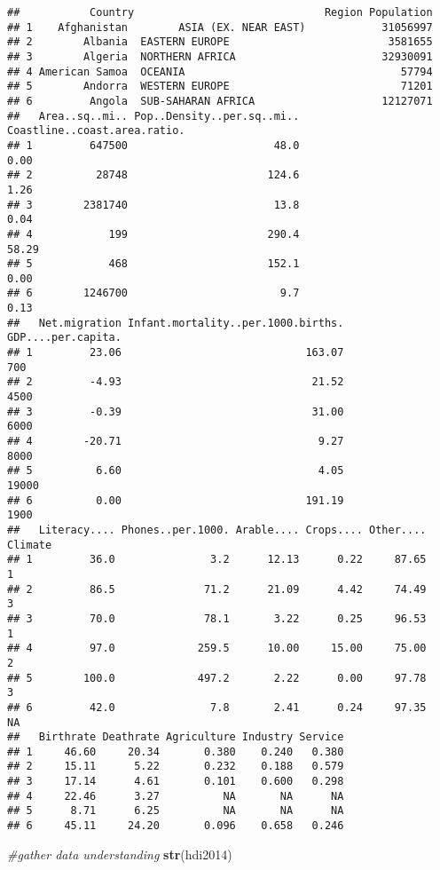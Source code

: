 \documentclass[]{article}
\newenvironment{Shaded}{\begin{snugshade}}{\end{snugshade}}
\newcommand{\CommentTok}[1]{\textcolor[rgb]{0.56,0.35,0.01}{\textit{#1}}}
\newcommand{\KeywordTok}[1]{\textcolor[rgb]{0.13,0.29,0.53}{\textbf{#1}}}
\newcommand{\NormalTok}[1]{#1}
\begin{document}
\begin{verbatim}
##           Country                              Region Population
## 1    Afghanistan        ASIA (EX. NEAR EAST)            31056997
## 2        Albania  EASTERN EUROPE                         3581655
## 3        Algeria  NORTHERN AFRICA                       32930091
## 4 American Samoa  OCEANIA                                  57794
## 5        Andorra  WESTERN EUROPE                           71201
## 6         Angola  SUB-SAHARAN AFRICA                    12127071
##   Area..sq..mi.. Pop..Density..per.sq..mi.. Coastline..coast.area.ratio.
## 1         647500                       48.0                         0.00
## 2          28748                      124.6                         1.26
## 3        2381740                       13.8                         0.04
## 4            199                      290.4                        58.29
## 5            468                      152.1                         0.00
## 6        1246700                        9.7                         0.13
##   Net.migration Infant.mortality..per.1000.births. GDP....per.capita.
## 1         23.06                             163.07                700
## 2         -4.93                              21.52               4500
## 3         -0.39                              31.00               6000
## 4        -20.71                               9.27               8000
## 5          6.60                               4.05              19000
## 6          0.00                             191.19               1900
##   Literacy.... Phones..per.1000. Arable.... Crops.... Other.... Climate
## 1         36.0               3.2      12.13      0.22     87.65       1
## 2         86.5              71.2      21.09      4.42     74.49       3
## 3         70.0              78.1       3.22      0.25     96.53       1
## 4         97.0             259.5      10.00     15.00     75.00       2
## 5        100.0             497.2       2.22      0.00     97.78       3
## 6         42.0               7.8       2.41      0.24     97.35      NA
##   Birthrate Deathrate Agriculture Industry Service
## 1     46.60     20.34       0.380    0.240   0.380
## 2     15.11      5.22       0.232    0.188   0.579
## 3     17.14      4.61       0.101    0.600   0.298
## 4     22.46      3.27          NA       NA      NA
## 5      8.71      6.25          NA       NA      NA
## 6     45.11     24.20       0.096    0.658   0.246
\end{verbatim}

\begin{Shaded}
\begin{Highlighting}[]
\CommentTok{#gather data understanding}
\KeywordTok{str}\NormalTok{(hdi2014)}
\end{Highlighting}
\end{Shaded}
\end{document}

